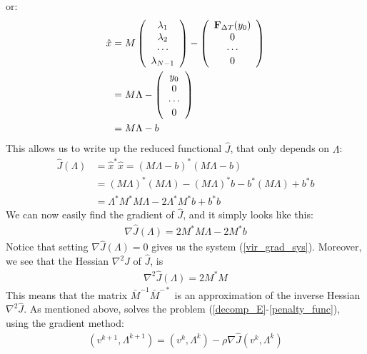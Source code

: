 or:
\begin{align}
\hat{x} &= M \left( \begin{array}{c}
   \lambda_1 \\  
   \lambda_2 \\ 
   \cdots  \\
   \lambda_{N-1}  \\
   \end{array}  \right) -
   \left( \begin{array}{c}
   \bold{F}_{\Delta T}(y_0)\\  
   0\\ 
   \cdots  \\
   0  \\
   \end{array}  \right) \\
   & = M \Lambda -\left( \begin{array}{c}
   y_0\\  
   0\\ 
   \cdots  \\
   0  \\
   \end{array}  \right) \\
   &=M \Lambda-b
\end{align}
This allows us to write up the reduced functional $\hat{J}$, that only depends on $\Lambda$:
\begin{align*}
\hat{J}(\Lambda)&= \hat{x}^*\hat{x} =
(M  \Lambda -b)^*(M  \Lambda -b) \\
&= (M  \Lambda)^*(M  \Lambda) - (M  \Lambda)^*b-b^*(M  \Lambda) + b^*b \\
&=\Lambda^*M^*M  \Lambda - 2\Lambda^*M^*b + b^*b
\end{align*}
We can now easily find the gradient of $\hat{J}$, and it simply looks like this:
\begin{align*}
\nabla\hat{J}(\Lambda) = 2 M^*M\Lambda - 2M^*b
\end{align*}
Notice that setting $\nabla\hat{J}(\Lambda)=0$ gives us the system (\ref{vir_grad_sys}). Moreover, we see that the Hessian $\nabla^2 \hat{J}$ of $\hat{J}$, is
\begin{align}
\nabla^2 \hat{J}(\Lambda) = 2 M^*M
\end{align}
This means that the matrix $\bar{M}^{-1}\bar{M}^{-*}$ is an approximation of the inverse Hessian $\nabla^2 \hat{J}$. As mentioned above, \cite{maday2002parareal} solves the problem (\ref{decomp_E}-\ref{penalty_func}), using the gradient method:
\begin{align}
(v^{k+1},\Lambda^{k+1}) = (v^{k},\Lambda^{k}) -\rho\nabla\hat{J}(v^{k},\Lambda^{k}) \label{gradient_method}
\end{align}
